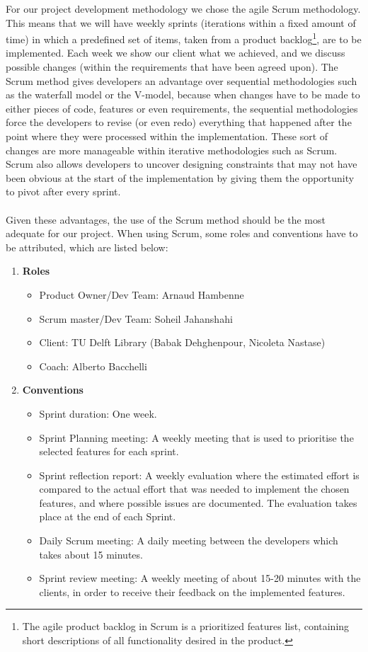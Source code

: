 For our project development methodology we chose the agile Scrum methodology. This means that we will have weekly sprints (iterations within a fixed amount of time) in which a predefined set of items, taken from a product backlog\footnote{The agile product backlog in Scrum is a prioritized features list, containing short descriptions of all functionality desired in the product.\cite{backlog} }, are to be implemented. Each week we show our client what we achieved, and we discuss possible changes (within the requirements that have been agreed upon). The Scrum method gives developers an advantage over sequential methodologies such as the waterfall model or the V-model, because when changes have to be made to either pieces of code, features or even requirements, the sequential methodologies force the developers to revise (or even redo) everything that happened after the point where they were processed within the implementation. These sort of changes are more manageable within iterative methodologies such as Scrum. Scrum also allows developers to uncover designing constraints that may not have been obvious at the start of the implementation by giving them the opportunity to pivot after every sprint. \\\\
Given these advantages, the use of the Scrum method should be the most adequate for our project. When using Scrum, some roles and conventions have to be attributed, which are listed below:

\begin{enumerate}
	\item \textbf{Roles}
		\begin{itemize}
			\item Product Owner/Dev Team: Arnaud Hambenne
			\item Scrum master/Dev Team: Soheil Jahanshahi
			\item Client: TU Delft Library (Babak Dehghenpour, Nicoleta Nastase)
			\item Coach: Alberto Bacchelli
		\end{itemize}
		\newpage
	\item \textbf{Conventions}	
\begin{itemize}
		\item Sprint duration: One week.
		\item Sprint Planning meeting: A weekly meeting that is used to prioritise the selected features for each sprint. 
		\item Sprint reflection report: A weekly evaluation where the estimated effort is compared to the actual effort that was needed to implement the chosen features, and where possible issues are documented. The evaluation takes place at the end of each Sprint.
		\item Daily Scrum meeting: A daily meeting between the developers which takes about 15 minutes.
		\item Sprint review meeting: A weekly meeting of about 15-20 minutes with the clients, in order to receive their feedback on the implemented features.
\end{itemize}
\end{enumerate}

